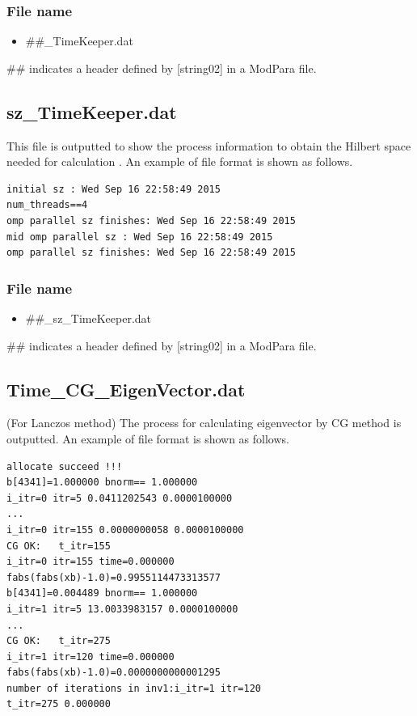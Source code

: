 \subsubsection{File name}
 \begin{itemize}
   \item  \#\#\_TimeKeeper.dat
  \end{itemize}
  \#\# indicates a header defined by [string02] in a ModPara file.

\subsection{sz\_TimeKeeper.dat}
This file is outputted to show the process information to obtain the Hilbert space needed for calculation .
An example of file format is shown as follows.

\begin{minipage}{12.5cm}
\begin{screen}
\begin{verbatim}
initial sz : Wed Sep 16 22:58:49 2015
num_threads==4
omp parallel sz finishes: Wed Sep 16 22:58:49 2015
mid omp parallel sz : Wed Sep 16 22:58:49 2015
omp parallel sz finishes: Wed Sep 16 22:58:49 2015
\end{verbatim}
\end{screen}
\end{minipage}

\subsubsection{File name}
 \begin{itemize}
   \item  \#\#\_sz\_TimeKeeper.dat
 \end{itemize}
 \#\# indicates a header defined by [string02] in a ModPara file.
 
\newpage
\subsection{Time\_CG\_EigenVector.dat}
\label{Subsec:timecgeigenv}
(For Lanczos method) The process for calculating eigenvector by CG method is outputted.
An example of file format is shown as follows.

\begin{minipage}{12.5cm}
\begin{screen}
\begin{verbatim}
allocate succeed !!! 
b[4341]=1.000000 bnorm== 1.000000 
i_itr=0 itr=5 0.0411202543 0.0000100000 
...
i_itr=0 itr=155 0.0000000058 0.0000100000 
CG OK:   t_itr=155 
i_itr=0 itr=155 time=0.000000  
fabs(fabs(xb)-1.0)=0.9955114473313577
b[4341]=0.004489 bnorm== 1.000000 
i_itr=1 itr=5 13.0033983157 0.0000100000 
...
CG OK:   t_itr=275 
i_itr=1 itr=120 time=0.000000  
fabs(fabs(xb)-1.0)=0.0000000000001295
number of iterations in inv1:i_itr=1 itr=120 
t_itr=275 0.000000
\end{verbatim}
\end{screen}
\end{minipage}

